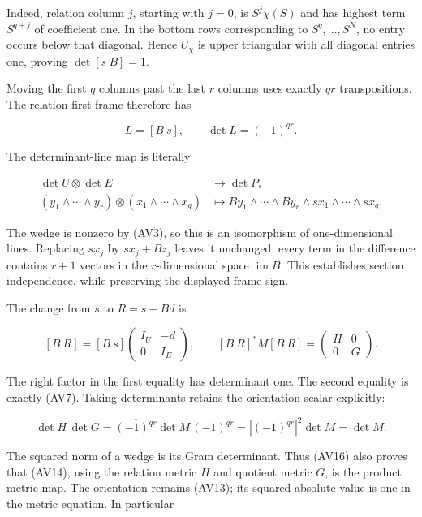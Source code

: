 Indeed, relation column \(j\), starting with \(j=0\), is \(S^j\chi(S)\) and has highest term \(S^{q+j}\) of coefficient one. In the bottom rows corresponding to \(S^q,\ldots,S^N\), no entry occurs below that diagonal. Hence \(U_\chi\) is upper triangular with all diagonal entries one, proving \(\det[s\ B]=1\).

Moving the first \(q\) columns past the last \(r\) columns uses exactly \(qr\) transpositions. The relation-first frame therefore has

\[
L=[B\ s],\qquad \det L=(-1)^{qr}.
\tag{AV13}
\]

The determinant-line map is literally

\[
\begin{aligned}
\det U\otimes\det E&\longrightarrow\det P,\\
(y_1\wedge\cdots\wedge y_r)\otimes(x_1\wedge\cdots\wedge x_q)
&\longmapsto
By_1\wedge\cdots\wedge By_r
\wedge sx_1\wedge\cdots\wedge sx_q .
\end{aligned}
\tag{AV14}
\]

The wedge is nonzero by (AV3), so this is an isomorphism of one-dimensional lines. Replacing \(sx_j\) by \(sx_j+Bz_j\) leaves it unchanged: every term in the difference contains \(r+1\) vectors in the \(r\)-dimensional space \(\operatorname{im}B\). This establishes section independence, while preserving the displayed frame sign.

The change from \(s\) to \(R=s-Bd\) is

\[
[B\ R]=[B\ s]
\begin{pmatrix}I_U&-d\\0&I_E\end{pmatrix},
\qquad
[B\ R]^*M[B\ R]=
\begin{pmatrix}H&0\\0&G\end{pmatrix}.
\tag{AV15}
\]

The right factor in the first equality has determinant one. The second equality is exactly (AV7). Taking determinants retains the orientation scalar explicitly:

\[
\det H\,\det G
=\overline{(-1)^{qr}}\det M\,(-1)^{qr}
=|(-1)^{qr}|^2\det M=\det M.
\tag{AV16}
\]

The squared norm of a wedge is its Gram determinant. Thus (AV16) also proves that (AV14), using the relation metric \(H\) and quotient metric \(G\), is the product metric map. The orientation remains (AV13); its squared absolute value is one in the metric equation. In particular

